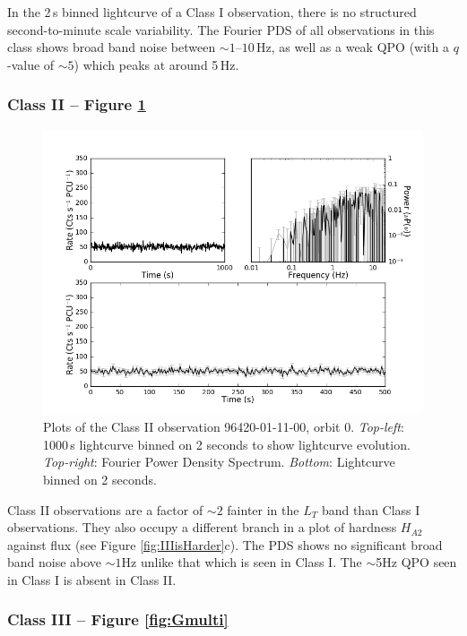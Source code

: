 In the 2\,s binned lightcurve of a Class I observation, there is no structured second-to-minute scale variability.  The Fourier PDS of all observations in this class shows broad band noise between $\sim1$--$10$\,Hz, as well as a weak QPO (with a $q$-value of $\sim5$) which peaks at around 5\,Hz.

\subsubsection{Class II -- Figure \ref{fig:Emulti}}

\begin{figure}
    \includegraphics[width=0.8\columnwidth, trim = 0.6cm 0 3.9cm 0]{images/Emulti.png}
    \captionsetup{singlelinecheck=off}
    \caption{Plots of the Class II observation 96420-01-11-00, orbit 0.  \textit{Top-left}:  1000\,s lightcurve binned on 2 seconds to show lightcurve evolution.  \textit{Top-right}: Fourier Power Density Spectrum.  \textit{Bottom}: Lightcurve binned on 2 seconds.}
   \label{fig:Emulti}
\end{figure}

\par Class II observations are a factor of $\sim2$ fainter in the $L_T$ band than Class I observations.  They also occupy a different branch in a plot of hardness $H_{A2}$ against flux (see Figure \ref{fig:IIIisHarder}c).  The PDS shows no significant broad band noise above $\sim1$Hz unlike that which is seen in Class I.  The $\sim$5Hz QPO seen in Class I is absent in Class II.

\subsubsection{Class III -- Figure \ref{fig:Gmulti}}
\label{sec:classIII}

